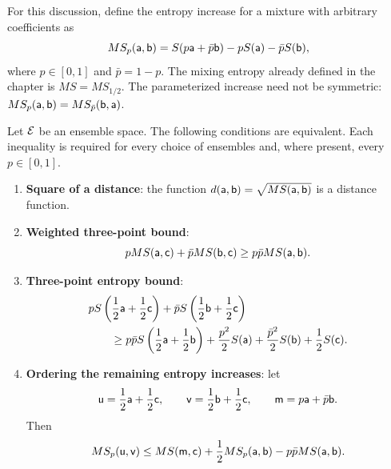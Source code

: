 For this discussion, define the entropy increase for a mixture with arbitrary coefficients as
\begin{equation}
	MS_p(\ens[a],\ens[b]) = S(p\ens[a]+\bar{p}\ens[b]) - pS(\ens[a]) - \bar{p}S(\ens[b]),
\end{equation}
where $p\in[0,1]$ and $\bar{p}=1-p$. The mixing entropy already defined in the chapter is $MS=MS_{1/2}$. The parameterized increase need not be symmetric: $MS_p(\ens[a],\ens[b])=MS_{\bar{p}}(\ens[b],\ens[a])$.

\begin{prop}\label{pm-es-mixingEntropyDistanceEquivalences}
	Let $\Ens$ be an ensemble space. The following conditions are equivalent. Each inequality is required for every choice of ensembles and, where present, every $p\in[0,1]$.
	\begin{enumerate}
		\item \textbf{Square of a distance}: the function $d(\ens[a],\ens[b])=\sqrt{MS(\ens[a],\ens[b])}$ is a distance function.
		
		\item \textbf{Weighted three-point bound}:
		\begin{equation}
			pMS(\ens[a],\ens[c])+\bar{p}MS(\ens[b],\ens[c]) \geq p\bar{p}MS(\ens[a],\ens[b]).
		\end{equation}
		
		\item \textbf{Three-point entropy bound}:
		\begin{equation}
			\begin{aligned}
				&pS\left(\frac{1}{2}\ens[a]+\frac{1}{2}\ens[c]\right)
				+\bar{p}S\left(\frac{1}{2}\ens[b]+\frac{1}{2}\ens[c]\right)\\
				&\qquad\geq p\bar{p}S\left(\frac{1}{2}\ens[a]+\frac{1}{2}\ens[b]\right)
				+\frac{p^2}{2}S(\ens[a])+\frac{\bar{p}^2}{2}S(\ens[b])+\frac{1}{2}S(\ens[c]).
			\end{aligned}
		\end{equation}
		
		\item \textbf{Ordering the remaining entropy increases}: let
		\begin{equation}
			\ens[u]=\frac{1}{2}\ens[a]+\frac{1}{2}\ens[c],\qquad
			\ens[v]=\frac{1}{2}\ens[b]+\frac{1}{2}\ens[c],\qquad
			\ens[m]=p\ens[a]+\bar{p}\ens[b].
		\end{equation}
		Then
		\begin{equation}
			MS_p(\ens[u],\ens[v])
			\leq MS(\ens[m],\ens[c])+\frac{1}{2}MS_p(\ens[a],\ens[b])-p\bar{p}MS(\ens[a],\ens[b]).
		\end{equation}
		

\end{enumerate}
\end{prop}
